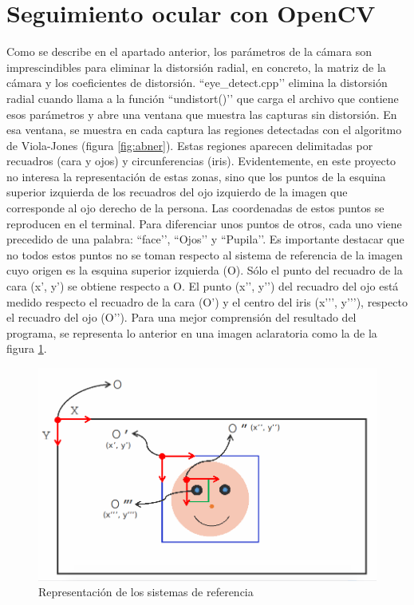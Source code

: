 \section{Seguimiento ocular con OpenCV} \label{s4_3}

Como se describe en el apartado anterior, los parámetros de la cámara son imprescindibles para eliminar la distorsión radial, en concreto, la matriz de la cámara y los coeficientes de distorsión. ``eye\_detect.cpp’’ elimina la distorsión radial cuando llama a la función ``undistort()’’ que carga el archivo que contiene esos parámetros y abre una ventana que muestra las capturas sin distorsión. En esa ventana, se muestra en cada captura las regiones detectadas con el algoritmo de Viola-Jones (figura \ref{fig:abner}). Estas regiones aparecen delimitadas por recuadros (cara y ojos) y circunferencias (iris). Evidentemente, en este proyecto no interesa la representación de estas zonas, sino que los puntos de la esquina superior izquierda de los recuadros del ojo izquierdo de la imagen que corresponde al ojo derecho de la persona. Las coordenadas de estos puntos se reproducen en el terminal. Para diferenciar unos puntos de otros, cada uno viene precedido de una palabra: ``face’’, ``Ojos’’ y ``Pupila’’. Es importante destacar que no todos estos puntos no se toman respecto al sistema de referencia de la imagen cuyo origen es la esquina superior izquierda (O). Sólo el punto del recuadro de la cara (x’, y’) se obtiene respecto a O. El punto (x’’, y’’) del recuadro del ojo está medido respecto el recuadro de la cara (O’) y el centro del iris (x’’’, y’’’), respecto el recuadro del ojo (O’’). Para una mejor comprensión del resultado del programa, se representa lo anterior en una imagen aclaratoria como la de la figura \ref{fig: esquemacara}.

    \begin{figure}[H]
    \centering
    \includegraphics[scale = 0.5]{capitulo_04/figuras_dir/cara.jpg}
    \caption{Representación de los sistemas de referencia}
    \label{fig: esquemacara}
    \end{figure}
    
